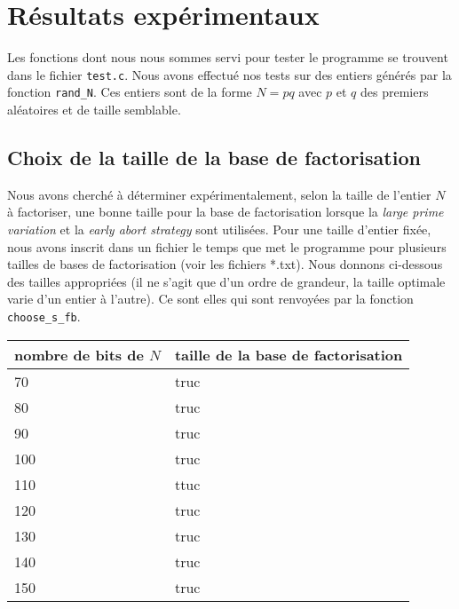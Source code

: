\newpage

\section{Résultats expérimentaux}

Les fonctions dont nous nous sommes servi pour tester le programme se trouvent
dans le fichier \texttt{test.c}. Nous avons effectué nos tests sur des entiers
générés par la fonction \texttt{rand\_N}. Ces entiers sont de la forme $N = pq$
avec $p$ et $q$ des premiers aléatoires et de taille semblable. 

\subsection{Choix de la taille de la base de factorisation}

Nous avons cherché à déterminer expérimentalement, selon la taille de l'entier
$N$ à factoriser, une bonne taille pour la base de factorisation lorsque la \textit{large
prime variation} et la \textit{early abort strategy} sont utilisées. Pour une
taille d'entier fixée, nous avons inscrit dans un fichier le temps que met le
programme pour plusieurs tailles de bases de factorisation (voir les fichiers
*.txt). Nous donnons ci-dessous des tailles appropriées (il ne s'agit que d'un
ordre de grandeur, la taille optimale varie d'un entier à l'autre). Ce sont
elles qui sont renvoyées par la fonction \texttt{choose\_s\_fb}.

\begin{center}
    \begin{tabular}{ |l |l | }
        \hline
         nombre de bits de $N$ & taille de la base de factorisation \\ \hline
         70                    & truc                               \\ \hline
         80                    & truc                               \\ \hline
         90                    & truc                               \\ \hline 
         100                   & truc                               \\ \hline 
         110                   & ttuc                               \\ \hline 
         120                   & truc                               \\ \hline 
         130                   & truc                               \\ \hline 
         140                   & truc                               \\ \hline 
         150                   & truc                               \\ \hline
    \end{tabular}
\end{center}

